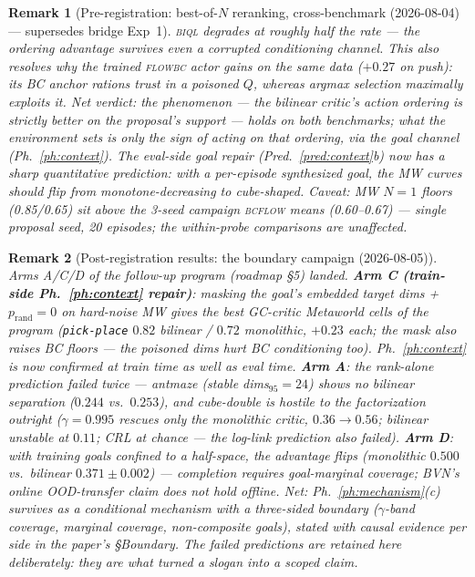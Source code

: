 \documentclass[10pt]{article}
\newtheorem{remark}{Remark}
\begin{document}
\begin{remark}[Pre-registration: best-of-$N$ reranking, cross-benchmark (2026-08-04) ---
supersedes bridge Exp~1]
\textsc{biql} degrades at roughly half the rate --- the ordering advantage survives even a
corrupted conditioning channel. This also resolves why the trained \textsc{flowbc} actor
\emph{gains} on the same data ($+0.27$ on push): its BC anchor rations trust in a
poisoned $Q$, whereas argmax selection maximally exploits it. Net verdict: the phenomenon
--- the bilinear critic's action ordering is strictly better on the proposal's support ---
holds on both benchmarks; what the environment sets is only the \emph{sign} of acting on
that ordering, via the goal channel (Ph.~\ref{ph:context}). The eval-side goal repair
(Pred.~\ref{pred:context}b) now has a sharp quantitative prediction: with a per-episode
synthesized goal, the MW curves should flip from monotone-decreasing to cube-shaped.
Caveat: MW $N{=}1$ floors (0.85/0.65) sit above the 3-seed campaign \textsc{bcflow} means
(0.60--0.67) --- single proposal seed, 20 episodes; the within-probe comparisons are
unaffected.
\end{remark}

\begin{remark}[Post-registration results: the boundary campaign (2026-08-05)]\label{rem:arms}
Arms A/C/D of the follow-up program (roadmap \S5) landed. \textbf{Arm C
(train-side Ph.~\ref{ph:context} repair)}: masking the goal's embedded target dims +
$p_{\mathrm{rand}}{=}0$ on hard-noise MW gives the best GC-critic Metaworld cells of the
program (\texttt{pick-place} $0.82$ bilinear / $0.72$ monolithic, $+0.23$ each; the mask
also raises BC floors --- the poisoned dims hurt BC conditioning too). Ph.~\ref{ph:context}
is now confirmed at train time as well as eval time. \textbf{Arm A}: the rank-alone
prediction \emph{failed twice} --- antmaze (stable dims$_{95}{=}24$) shows no bilinear
separation ($0.244$ vs.\ $0.253$), and cube-double is hostile to the factorization
outright ($\gamma{=}0.995$ rescues only the monolithic critic, $0.36\to0.56$; bilinear
unstable at $0.11$; CRL at chance --- the log-link prediction also failed).
\textbf{Arm D}: with training goals confined to a half-space, the advantage flips
(monolithic $0.500$ vs.\ bilinear $0.371\pm0.002$) --- completion requires goal-marginal
coverage; BVN's online OOD-transfer claim does not hold offline. Net: Ph.~\ref{ph:mechanism}(c)
survives as a \emph{conditional} mechanism with a three-sided boundary ($\gamma$-band
coverage, marginal coverage, non-composite goals), stated with causal evidence per side in
the paper's \S{}Boundary. The failed predictions are retained here deliberately: they are
what turned a slogan into a scoped claim.
\end{remark}
\end{document}
